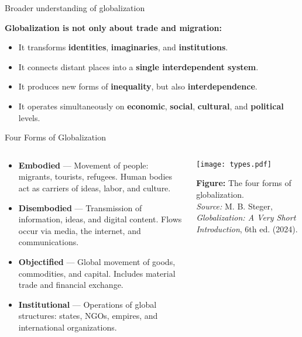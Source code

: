 \documentclass{beamer}
\begin{document}
\begin{frame}{Broader understanding of globalization}
    

\textbf{Globalization is not only about trade and migration:}
\begin{itemize}
    \item It transforms \textbf{identities}, \textbf{imaginaries}, and \textbf{institutions}.
    \item It connects distant places into a \textbf{single interdependent system}.
    \item It produces new forms of \textbf{inequality}, but also \textbf{interdependence}.
    \item It operates simultaneously on \textbf{economic}, \textbf{social}, \textbf{cultural}, and \textbf{political} levels.
\end{itemize}
\end{frame}


\begin{frame}{Four Forms of Globalization}

\begin{columns}[c,onlytextwidth]

    \begin{column}{0.52\textwidth}
        \begin{itemize}
            \setlength\itemsep{0.9em}
            \small
            \item \textbf{Embodied} — Movement of people: migrants, tourists, refugees. Human bodies act as carriers of ideas, labor, and culture.

            \item \textbf{Disembodied} — Transmission of information, ideas, and digital content. Flows occur via media, the internet, and communications.

            \item \textbf{Objectified} — Global movement of goods, commodities, and capital. Includes material trade and financial exchange.

            \item \textbf{Institutional} — Operations of global structures: states, NGOs, empires, and international organizations.
        \end{itemize}
    \end{column}

    \begin{column}{0.5\textwidth}
        \centering
        \texttt{[image: types.pdf]}
        \vspace{0.3em}

        \scriptsize
        \textbf{Figure:} The four forms of globalization.\\
        \textit{Source:} M. B. Steger, \textit{Globalization: A Very Short Introduction}, 6th ed. (2024).
    \end{column}

\end{columns}

\end{frame}
\end{document}
